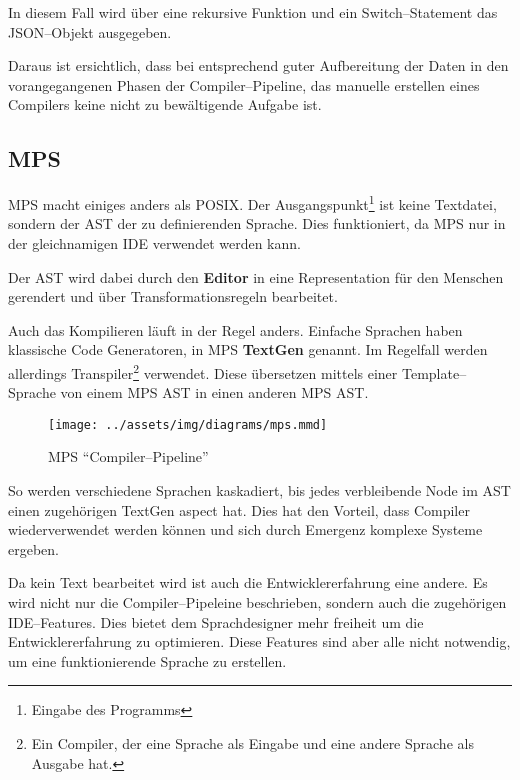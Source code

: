 In diesem Fall wird über eine rekursive Funktion und ein Switch--Statement das \acs{JSON}--Objekt ausgegeben.

Daraus ist ersichtlich, dass bei entsprechend guter Aufbereitung der Daten in den vorangegangenen Phasen der Compiler--Pipeline, das manuelle erstellen eines Compilers keine nicht zu bewältigende Aufgabe ist.

\subsection{\acl{MPS}}\label{subsec:meta-programming-system}
\ac{MPS} macht einiges anders als \ac{POSIX}.
Der Ausgangspunkt\footnote{Eingabe des Programms} ist keine Textdatei, sondern der \ac{AST} der zu definierenden Sprache.
Dies funktioniert, da \ac{MPS} nur in der gleichnamigen \ac{IDE} verwendet werden kann.

Der \ac{AST} wird dabei durch den \textbf{Editor} in eine Representation für den Menschen gerendert und über Transformationsregeln bearbeitet.

Auch das Kompilieren läuft in der Regel anders.
Einfache Sprachen haben klassische Code Generatoren, in \ac{MPS} \textbf{TextGen} genannt.
Im Regelfall werden allerdings Transpiler\footnote{Ein Compiler, der eine Sprache als Eingabe und eine andere Sprache als Ausgabe hat.} verwendet.
Diese übersetzen mittels einer Template--Sprache von einem \ac{MPS} \ac{AST} in einen anderen \ac{MPS} \ac{AST}.

\begin{wrapfigure}{lH}{0.5\textwidth}
    \begin{center}
        \texttt{[image: ../assets/img/diagrams/mps.mmd]}
    \end{center}
    \caption{\acs{MPS} \enquote{Compiler--Pipeline}}
    \label{fig:mps-compiler-pipeline}
\end{wrapfigure}

So werden verschiedene Sprachen kaskadiert, bis jedes verbleibende Node im \ac{AST} einen zugehörigen TextGen aspect hat.
Dies hat den Vorteil, dass Compiler wiederverwendet werden können und sich durch Emergenz komplexe Systeme ergeben.

Da kein Text bearbeitet wird ist auch die Entwicklererfahrung eine andere.
Es wird nicht nur die Compiler--Pipeleine beschrieben, sondern auch die zugehörigen \acs{IDE}--Features.
Dies bietet dem Sprachdesigner mehr freiheit um die Entwicklererfahrung zu optimieren.
Diese Features sind aber alle nicht notwendig, um eine funktionierende Sprache zu erstellen.

